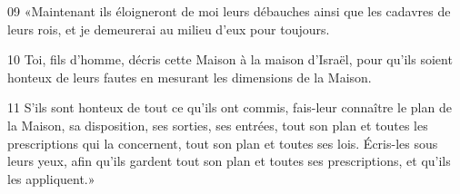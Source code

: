 
09 «Maintenant ils éloigneront de moi leurs débauches ainsi que les cadavres de leurs rois, et je demeurerai au milieu d’eux pour toujours.

10 Toi, fils d’homme, décris cette Maison à la maison d’Israël, pour qu’ils soient honteux de leurs fautes en mesurant les dimensions de la Maison.

11 S’ils sont honteux de tout ce qu’ils ont commis, fais-leur connaître le plan de la Maison, sa disposition, ses sorties, ses entrées, tout son plan et toutes les prescriptions qui la concernent, tout son plan et toutes ses lois. Écris-les sous leurs yeux, afin qu’ils gardent tout son plan et toutes ses prescriptions, et qu’ils les appliquent.»